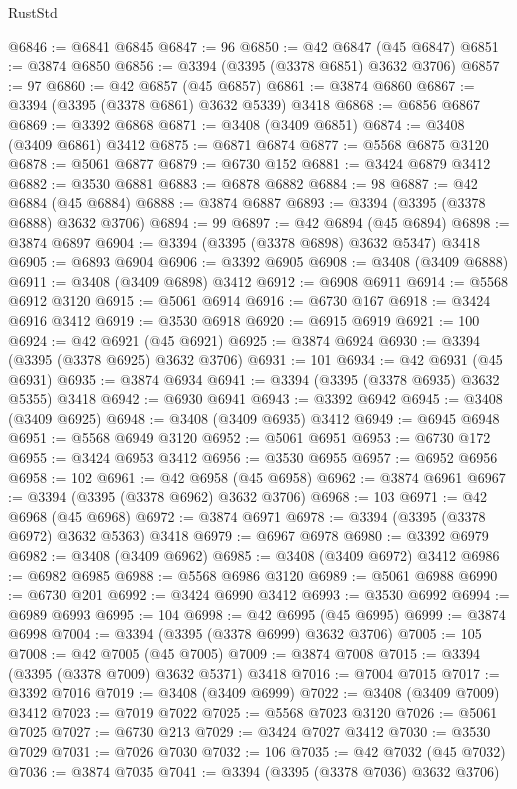 \begin{lexlean}{RustStd}
\begin{coremodule}
@6846 := @6841 @6845
@6847 := 96
@6850 := @42 @6847 (@45 @6847)
@6851 := @3874 @6850
@6856 := @3394 (@3395 (@3378 @6851) @3632 @3706)
@6857 := 97
@6860 := @42 @6857 (@45 @6857)
@6861 := @3874 @6860
@6867 := @3394 (@3395 (@3378 @6861) @3632 @5339) @3418
@6868 := @6856 @6867
@6869 := @3392 @6868
@6871 := @3408 (@3409 @6851)
@6874 := @3408 (@3409 @6861) @3412
@6875 := @6871 @6874
@6877 := @5568 @6875 @3120
@6878 := @5061 @6877
@6879 := @6730 @152
@6881 := @3424 @6879 @3412
@6882 := @3530 @6881
@6883 := @6878 @6882
@6884 := 98
@6887 := @42 @6884 (@45 @6884)
@6888 := @3874 @6887
@6893 := @3394 (@3395 (@3378 @6888) @3632 @3706)
@6894 := 99
@6897 := @42 @6894 (@45 @6894)
@6898 := @3874 @6897
@6904 := @3394 (@3395 (@3378 @6898) @3632 @5347) @3418
@6905 := @6893 @6904
@6906 := @3392 @6905
@6908 := @3408 (@3409 @6888)
@6911 := @3408 (@3409 @6898) @3412
@6912 := @6908 @6911
@6914 := @5568 @6912 @3120
@6915 := @5061 @6914
@6916 := @6730 @167
@6918 := @3424 @6916 @3412
@6919 := @3530 @6918
@6920 := @6915 @6919
@6921 := 100
@6924 := @42 @6921 (@45 @6921)
@6925 := @3874 @6924
@6930 := @3394 (@3395 (@3378 @6925) @3632 @3706)
@6931 := 101
@6934 := @42 @6931 (@45 @6931)
@6935 := @3874 @6934
@6941 := @3394 (@3395 (@3378 @6935) @3632 @5355) @3418
@6942 := @6930 @6941
@6943 := @3392 @6942
@6945 := @3408 (@3409 @6925)
@6948 := @3408 (@3409 @6935) @3412
@6949 := @6945 @6948
@6951 := @5568 @6949 @3120
@6952 := @5061 @6951
@6953 := @6730 @172
@6955 := @3424 @6953 @3412
@6956 := @3530 @6955
@6957 := @6952 @6956
@6958 := 102
@6961 := @42 @6958 (@45 @6958)
@6962 := @3874 @6961
@6967 := @3394 (@3395 (@3378 @6962) @3632 @3706)
@6968 := 103
@6971 := @42 @6968 (@45 @6968)
@6972 := @3874 @6971
@6978 := @3394 (@3395 (@3378 @6972) @3632 @5363) @3418
@6979 := @6967 @6978
@6980 := @3392 @6979
@6982 := @3408 (@3409 @6962)
@6985 := @3408 (@3409 @6972) @3412
@6986 := @6982 @6985
@6988 := @5568 @6986 @3120
@6989 := @5061 @6988
@6990 := @6730 @201
@6992 := @3424 @6990 @3412
@6993 := @3530 @6992
@6994 := @6989 @6993
@6995 := 104
@6998 := @42 @6995 (@45 @6995)
@6999 := @3874 @6998
@7004 := @3394 (@3395 (@3378 @6999) @3632 @3706)
@7005 := 105
@7008 := @42 @7005 (@45 @7005)
@7009 := @3874 @7008
@7015 := @3394 (@3395 (@3378 @7009) @3632 @5371) @3418
@7016 := @7004 @7015
@7017 := @3392 @7016
@7019 := @3408 (@3409 @6999)
@7022 := @3408 (@3409 @7009) @3412
@7023 := @7019 @7022
@7025 := @5568 @7023 @3120
@7026 := @5061 @7025
@7027 := @6730 @213
@7029 := @3424 @7027 @3412
@7030 := @3530 @7029
@7031 := @7026 @7030
@7032 := 106
@7035 := @42 @7032 (@45 @7032)
@7036 := @3874 @7035
@7041 := @3394 (@3395 (@3378 @7036) @3632 @3706)

\end{coremodule}
\end{lexlean}
